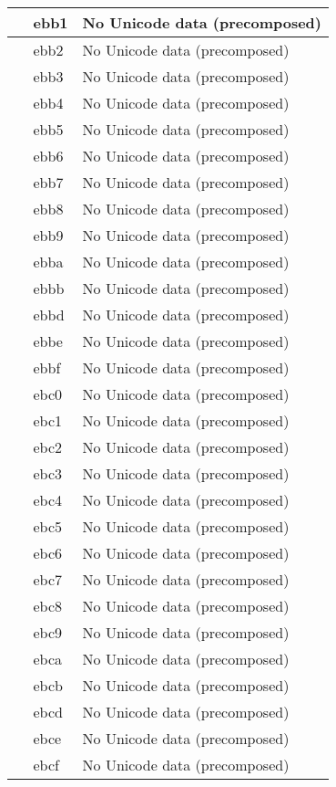 \documentclass[12pt,letterpaper,openany]{book}
\begin{document}
\begin{center}
\begin{supertabular}{|m{0.25in}|m{0.5in}|m{4in}|}
			 & ebb1 & No Unicode data (precomposed)\\\hline
			 & ebb2 & No Unicode data (precomposed)\\\hline
			 & ebb3 & No Unicode data (precomposed)\\\hline
			 & ebb4 & No Unicode data (precomposed)\\\hline
			 & ebb5 & No Unicode data (precomposed)\\\hline
			 & ebb6 & No Unicode data (precomposed)\\\hline
			 & ebb7 & No Unicode data (precomposed)\\\hline
			 & ebb8 & No Unicode data (precomposed)\\\hline
			 & ebb9 & No Unicode data (precomposed)\\\hline
			 & ebba & No Unicode data (precomposed)\\\hline
			 & ebbb & No Unicode data (precomposed)\\\hline
			 & ebbd & No Unicode data (precomposed)\\\hline
			 & ebbe & No Unicode data (precomposed)\\\hline
			 & ebbf & No Unicode data (precomposed)\\\hline
			 & ebc0 & No Unicode data (precomposed)\\\hline
			 & ebc1 & No Unicode data (precomposed)\\\hline
			 & ebc2 & No Unicode data (precomposed)\\\hline
			 & ebc3 & No Unicode data (precomposed)\\\hline
			 & ebc4 & No Unicode data (precomposed)\\\hline
			 & ebc5 & No Unicode data (precomposed)\\\hline
			 & ebc6 & No Unicode data (precomposed)\\\hline
			 & ebc7 & No Unicode data (precomposed)\\\hline
			 & ebc8 & No Unicode data (precomposed)\\\hline
			 & ebc9 & No Unicode data (precomposed)\\\hline
			 & ebca & No Unicode data (precomposed)\\\hline
			 & ebcb & No Unicode data (precomposed)\\\hline
			 & ebcd & No Unicode data (precomposed)\\\hline
			 & ebce & No Unicode data (precomposed)\\\hline
			 & ebcf & No Unicode data (precomposed)\\\hline

\end{supertabular}
\end{center}
\end{document}
